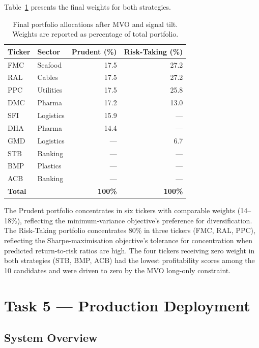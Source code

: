 \documentclass[12pt, a4paper]{article}
\begin{document}
Table~\ref{tab:portfolio_alloc} presents the final weights for both strategies.

\begin{table}[h]
\centering
\caption{Final portfolio allocations after MVO and signal tilt.
         Weights are reported as percentage of total portfolio.}
\label{tab:portfolio_alloc}
\renewcommand{\arraystretch}{1.3}
\begin{tabular}{llrr}
\hline
\textbf{Ticker} & \textbf{Sector}
  & \textbf{Prudent (\%)} & \textbf{Risk-Taking (\%)} \\
\hline
FMC & Seafood    & 17.5 & 27.2 \\
RAL & Cables     & 17.5 & 27.2 \\
PPC & Utilities  & 17.5 & 25.8 \\
DMC & Pharma     & 17.2 & 13.0 \\
SFI & Logistics  & 15.9 & --- \\
DHA & Pharma     & 14.4 & --- \\
GMD & Logistics  & --- & 6.7 \\
STB & Banking    & --- & --- \\
BMP & Plastics   & --- & --- \\
ACB & Banking    & --- & --- \\
\hline
\textbf{Total}  & & \textbf{100\%} & \textbf{100\%} \\
\hline
\end{tabular}
\end{table}

The Prudent portfolio concentrates in six tickers with
comparable weights (14--18\%), reflecting the minimum-variance
objective's preference for diversification. The Risk-Taking
portfolio concentrates 80\% in three tickers (FMC, RAL, PPC),
reflecting the Sharpe-maximisation objective's tolerance for
concentration when predicted return-to-risk ratios are high.
The four tickers receiving zero weight in both strategies
(STB, BMP, ACB) had the lowest profitability scores among
the 10 candidates and were driven to zero by the MVO
long-only constraint.


\clearpage
\section{Task 5 --- Production Deployment}

\subsection{System Overview}
\end{document}
